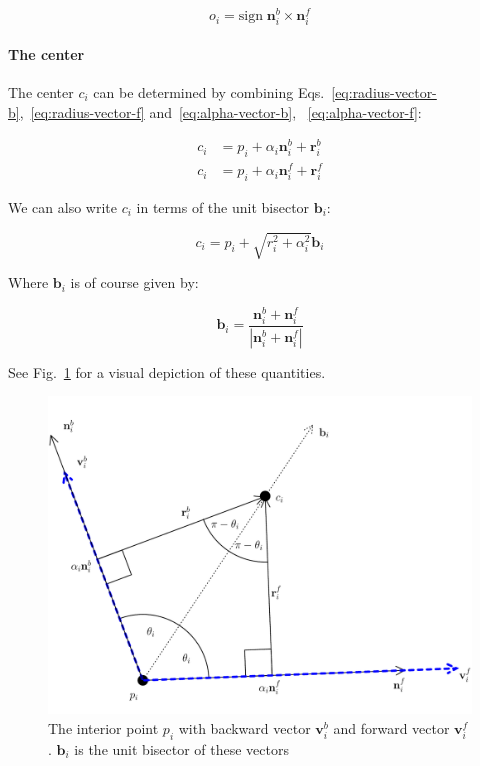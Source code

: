 \documentclass{article}
\begin{document}
\begin{equation}
  \label{eq:orientation}
  o_i = \mathrm{sign}\; \mathbf{n}^{b}_{i} \times \mathbf{n}^{f}_{i}
\end{equation}

\paragraph{The center}

The center $c_{i}$ can be determined by combining Eqs.~\eqref{eq:radius-vector-b},~\eqref{eq:radius-vector-f} and~\eqref{eq:alpha-vector-b}, ~\eqref{eq:alpha-vector-f}:

\begin{align}
  \label{eq:center-vector-b}
  c_{i} &= p_{i} + \alpha_i\mathbf{n}^b_i + \mathbf{r}^{b}_{i}\\
  \label{eq:center-vector-f}
  c_{i} &= p_{i} + \alpha_i\mathbf{n}^f_i + \mathbf{r}^{f}_{i}
\end{align}

We can also write $c_{i}$ in terms of the unit bisector $\mathbf{b}_{i}$:

\begin{equation}
  \label{eq:center-bisector}
  c_{i} = p_{i} + \sqrt{r_{i}^{2} + \alpha_{i}^{2}}\mathbf{b}_{i}
\end{equation}

Where $\mathbf{b}_i$ is of course given by:

\begin{equation}
  \label{eq:bisector}
  \mathbf{b}_i = \frac{\mathbf{n}^b_i + \mathbf{n}^f_i}{\left|\mathbf{n}^b_i + \mathbf{n}^f_i\right|}
\end{equation}

See Fig.~\ref{fig:interior-point} for a visual depiction of these quantities.

\begin{figure}[h]
  \centering
  \includegraphics[width=\columnwidth]{4}
  \caption{The interior point $p_{i}$ with backward vector $\mathbf{v}^{b}_{i}$ and forward vector $\mathbf{v}^{f}_{i}$. $\mathbf{b}_{i}$ is the unit bisector of these vectors}
  \label{fig:interior-point}
\end{figure}
\end{document}
